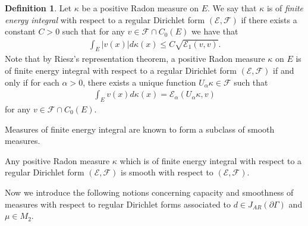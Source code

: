 \documentclass[10pt]{amsart}
\theoremstyle{definition}\newtheorem{defi}[theo]{Definition}\newtheorem{rema}[theo]{Remark}\newtheorem{exam}[theo]{Example}\newtheorem{exem}[theo]{Example}\newtheorem{nota}[theo]{Notation}
\newcommand{\ce}{\mathcal{E}}
\newcommand{\cf}{\mathcal{F}}
\begin{document}
\begin{defi}
Let $\kappa$ be a positive Radon measure on $E$. We say that $\kappa$ is of \emph{finite energy integral} with respect to a regular Dirichlet form $(\ce,\cf)$ if there exists a constant $C>0$ such that for any $v\in\cf\cap C_0(E)$ we have that
\begin{align*}
\int_E|v(x)|d\kappa(x)\leq C\sqrt{\ce_1(v,v)}.
\end{align*}
Note that by Riesz's representation theorem, a positive Radon measure $\kappa$ on $E$ is of finite energy integral with respect to a regular Dirichlet form $(\ce,\cf)$ if and only if for each $\alpha>0$, there exists a unique function $U_{\alpha}\kappa\in \cf$ such that
\begin{align*}
\int_Ev(x)d\kappa(x)=\ce_{\alpha}(U_{\alpha}\kappa,v)
\end{align*}
for any $v\in\cf\cap C_0(E)$.
\end{defi}
Measures of finite energy integral are known to form a subclass of smooth measures.

\begin{prop}
Any positive Radon measure $\kappa$ which is of finite energy integral with respect to a regular Dirichlet form $(\ce,\cf)$ is smooth with respect to $(\ce,\cf)$.
\end{prop}

Now we introduce the following notions concerning capacity and smoothness of measures with respect to regular Dirichlet forms associated to $d\in J_{AR}(\partial\Gamma)$ and $\mu\in M_2$.
\end{document}
